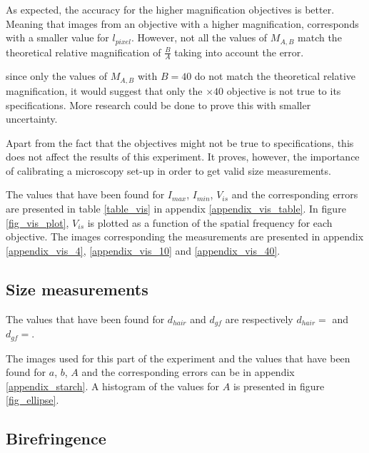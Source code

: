 As expected, the accuracy for the higher magnification objectives is better. Meaning that images from an objective with a higher magnification, corresponds with a smaller value for $l_{pixel}$. However, not all the values of $M_{A,B}$ match the theoretical relative magnification of $\frac{B}{A}$ taking into account the error. 

since only the values of $M_{A,B}$ with $B = 40$ do not match the theoretical relative magnification, it would suggest that only the $\times 40$ objective is not true to its specifications. More research could be done to prove this with smaller uncertainty. 

Apart from the fact that the objectives might not be true to specifications, this does not affect the results of this experiment. It proves, however, the importance of calibrating a microscopy set-up in order to get valid size measurements.  

\bigskip 


The values that have been found for $I_{max}$, $I_{min}$, $V_{is}$ and the corresponding errors are presented in table \ref{table_vis} in appendix \ref{appendix_vis_table}. In figure \ref{fig_vis_plot}, $V_{is}$ is plotted as a function of the spatial frequency for each objective. The images corresponding the measurements are presented in appendix \ref{appendix_vis_4}, \ref{appendix_vis_10} and \ref{appendix_vis_40}.



\subsection{Size measurements}

The values that have been found for $d_{hair}$ and $d_{gf}$ are respectively $d_{hair} =  $ and $d_{gf} =  $. 


The images used for this part of the experiment and the values that have been found for $a$, $b$, $A$ and the corresponding errors can be  in appendix \ref{appendix_starch}. A histogram of the values for $A$ is presented in figure \ref{fig_ellipse}.



\subsection{Birefringence}

